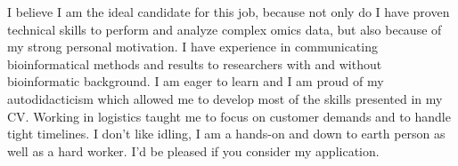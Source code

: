 \documentclass[11pt, a4paper]{awesome-cv}
\begin{document}
\begin{cvletter}
I believe I am the ideal candidate for this job, because not only do I have proven technical skills to perform and analyze complex omics data, but also because of my strong personal motivation.
I have experience in communicating bioinformatical methods and results to researchers with and without bioinformatic background.
I am eager to learn and I am proud of my autodidacticism which allowed me to develop most of the skills presented in my CV.
Working in logistics taught me to focus on customer demands and to handle tight timelines.
I don't like idling, I am a hands-on and down to earth person as well as a hard worker.
I'd be pleased if you consider my application.
\end{cvletter}


\makeletterclosing
\end{document}
